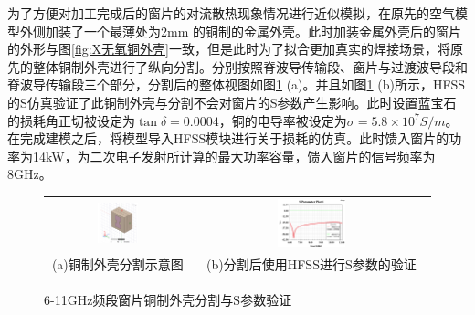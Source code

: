\documentclass[master]{thesis-uestc}
\begin{document}
为了方便对加工完成后的窗片的对流散热现象情况进行近似模拟，在原先的空气模型外侧加装了一个最薄处为2mm 的铜制的金属外壳。此时加装金属外壳后的窗片的外形与图\ref{fig:X无氧铜外壳}一致，但是此时为了拟合更加真实的焊接场景，将原先的整体铜制外壳进行了纵向分割。分别按照脊波导传输段、窗片与过渡波导段和脊波导传输段三个部分，分割后的整体视图如图\ref{fig:X频段铜制外壳分割后} (a)。并且如图\ref{fig:X频段铜制外壳分割后} (b)所示，HFSS的S仿真验证了此铜制外壳与分割不会对窗片的S参数产生影响。此时设置蓝宝石的损耗角正切被设定为\(\tan \delta = 0.0004\)，铜的电导率被设定为\(\sigma = 5.8 \times 10^7 S/m\)。在完成建模之后，将模型导入HFSS模块进行关于损耗的仿真。此时馈入窗片的功率为14kW，为二次电子发射所计算的最大功率容量，馈入窗片的信号频率为8GHz。
\begin{figure}[!htb]
    \small
    \centering
    \begin{tabular}{@{\ }c@{\ }c}
        \includegraphics[width=0.3\textwidth]{pic/chapter3/铜制外壳分割后.png} & 
        \hspace{5pt}
        \includegraphics[width=0.3\textwidth]{pic/chapter3/分割后的S参数.png}     \\
        \mbox{\small (a)铜制外壳分割示意图}                                                                               & 
        \mbox{\small (b)分割后使用HFSS进行S参数的验证}                                                                                  \\
    \end{tabular}
    \caption{6-11GHz频段窗片铜制外壳分割与S参数验证}
    \label{fig:X频段铜制外壳分割后}
\end{figure}
\end{document}
